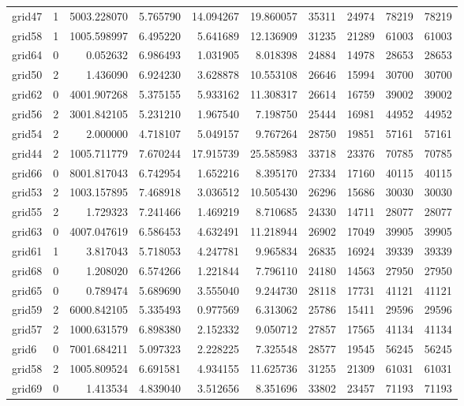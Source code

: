 \begin{longtable}{|l|r|r|r|r|r|r|r|r|r|}
grid47 & 1 & 5003.228070 & 5.765790 & 14.094267 & 19.860057 & 35311 & 24974 & 78219 & 78219 \\
grid58 & 1 & 1005.598997 & 6.495220 & 5.641689 & 12.136909 & 31235 & 21289 & 61003 & 61003 \\
grid64 & 0 & 0.052632 & 6.986493 & 1.031905 & 8.018398 & 24884 & 14978 & 28653 & 28653 \\
grid50 & 2 & 1.436090 & 6.924230 & 3.628878 & 10.553108 & 26646 & 15994 & 30700 & 30700 \\
grid62 & 0 & 4001.907268 & 5.375155 & 5.933162 & 11.308317 & 26614 & 16759 & 39002 & 39002 \\
grid56 & 2 & 3001.842105 & 5.231210 & 1.967540 & 7.198750 & 25444 & 16981 & 44952 & 44952 \\
grid54 & 2 & 2.000000 & 4.718107 & 5.049157 & 9.767264 & 28750 & 19851 & 57161 & 57161 \\
grid44 & 2 & 1005.711779 & 7.670244 & 17.915739 & 25.585983 & 33718 & 23376 & 70785 & 70785 \\
grid66 & 0 & 8001.817043 & 6.742954 & 1.652216 & 8.395170 & 27334 & 17160 & 40115 & 40115 \\
grid53 & 2 & 1003.157895 & 7.468918 & 3.036512 & 10.505430 & 26296 & 15686 & 30030 & 30030 \\
grid55 & 2 & 1.729323 & 7.241466 & 1.469219 & 8.710685 & 24330 & 14711 & 28077 & 28077 \\
grid63 & 0 & 4007.047619 & 6.586453 & 4.632491 & 11.218944 & 26902 & 17049 & 39905 & 39905 \\
grid61 & 1 & 3.817043 & 5.718053 & 4.247781 & 9.965834 & 26835 & 16924 & 39339 & 39339 \\
grid68 & 0 & 1.208020 & 6.574266 & 1.221844 & 7.796110 & 24180 & 14563 & 27950 & 27950 \\
grid65 & 0 & 0.789474 & 5.689690 & 3.555040 & 9.244730 & 28118 & 17731 & 41121 & 41121 \\
grid59 & 2 & 6000.842105 & 5.335493 & 0.977569 & 6.313062 & 25786 & 15411 & 29596 & 29596 \\
grid57 & 2 & 1000.631579 & 6.898380 & 2.152332 & 9.050712 & 27857 & 17565 & 41134 & 41134 \\
grid6 & 0 & 7001.684211 & 5.097323 & 2.228225 & 7.325548 & 28577 & 19545 & 56245 & 56245 \\
grid58 & 2 & 1005.809524 & 6.691581 & 4.934155 & 11.625736 & 31255 & 21309 & 61031 & 61031 \\
grid69 & 0 & 1.413534 & 4.839040 & 3.512656 & 8.351696 & 33802 & 23457 & 71193 & 71193 \\

\end{longtable}
